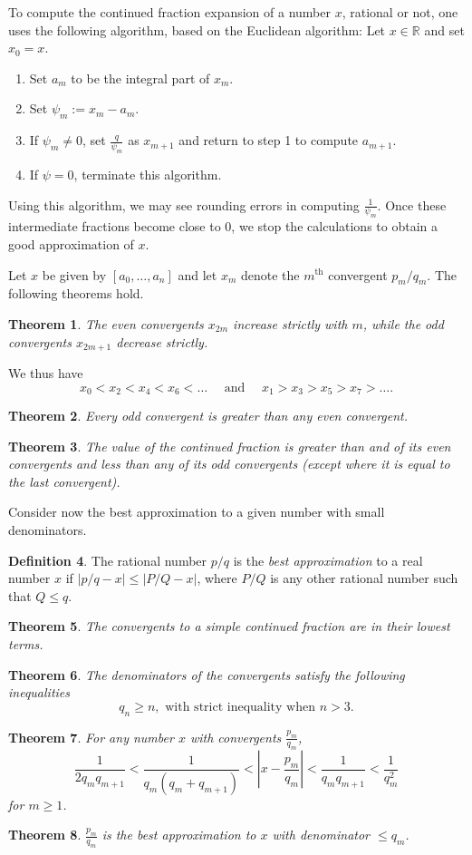 \documentclass[11pt]{report}
\newtheorem{theorem}{Theorem}[section]
\theoremstyle{definition}
\newtheorem{definition}[theorem]{Definition}
\begin{document}
To compute the continued fraction expansion of a number $x$, rational or not, one uses the following algorithm, based on the Euclidean algorithm:
Let $x \in \mathbb{R}$ and set $x_0 = x$.
\begin{enumerate}[1.]
\item Set $a_m$ to be the integral part of $x_m$.
\item Set $\psi_m:= x_m - a_m$.
\item If $\psi_m \neq 0$, set $\frac{q}{\psi_m}$ as $x_{m+1}$ and return to step 1 to compute $a_{m+1}$.
\item If $\psi = 0$, terminate this algorithm.
\end{enumerate}
Using this algorithm, we may see rounding errors in computing $\frac{1}{\psi_m}$. Once these intermediate fractions become close to $0$, we stop the calculations to obtain a good approximation of $x$.

Let $x$ be given by $[a_0, \dots, a_n]$ and let $x_m$ denote the $m^{\text{th}}$ convergent $p_m/q_m$. The following theorems hold.

\begin{theorem}
  The even convergents $x_{2m}$ increase strictly with $m$, while the odd convergents $x_{2m+1}$ decrease strictly.
\end{theorem}
We thus have
\[x_0 < x_2 < x_4 < x_6< \dots \quad \text{ and } \quad x_1 > x_3 > x_5 > x_7 > \dots.\]
\begin{theorem}
  Every odd convergent is greater than any even convergent.
\end{theorem}
\begin{theorem}
  The value of the continued fraction is greater than and of its even convergents and less than any of its odd convergents (except where it is equal to the last convergent).
\end{theorem}

Consider now the best approximation to a given number with small denominators.
\begin{definition}
  The rational number $p/q$ is the \textit{best approximation} to a real number $x$ if $|p/q - x| \leq |P/Q - x|$, where $P/Q$ is any other rational number such that $Q \leq q$.
\end{definition}
\begin{theorem}
  The convergents to a simple continued fraction are in their lowest terms.
\end{theorem}
\begin{theorem}
  The denominators of the convergents satisfy the following inequalities
  \[q_n \geq n, \text{ with strict inequality when } n > 3.\]
\end{theorem}
\begin{theorem}
  \label{th:convergentbound}
  For any number $x$ with convergents $\frac{p_m}{q_m}$,
  \[\frac{1}{2q_mq_{m+1}} < \frac{1}{q_m(q_m + q_{m+1})} < \left|x - \frac{p_m}{q_m}\right| < \frac{1}{q_mq_{m+1}} < \frac{1}{q_m^2}\]
  for $m \geq 1$.
\end{theorem}
\begin{theorem}
  $\frac{p_m}{q_m}$ is the best approximation to $x$ with denominator $\leq q_m$.
\end{theorem}
\end{document}

